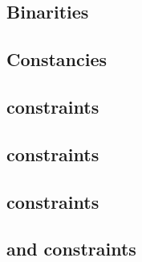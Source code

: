 \subsection{Binarities}                                                                                  \label{rlp auth: generalities: binarities}                                 
\subsection{Constancies}                                                                                 \label{rlp auth: generalities: constancies}                                
\subsection{\iomf{} constraints}                                                                         \label{rlp auth: generalities: iomf}                                       
\subsection{\userTransactionNumber{}           constraints}                                              \label{rlp auth: generalities: user transaction number}                    
\subsection{\rlpAuthMacroAuthorityTupleIndex{} constraints}                                              \label{rlp auth: generalities: authority tuple index}                      
\subsection{\transactionTypeWithAuthorityLists{} and \transactionTypeWithAuthorityLists{} constraints}   \label{rlp auth: generalities: transactions with or sans authority list}   
